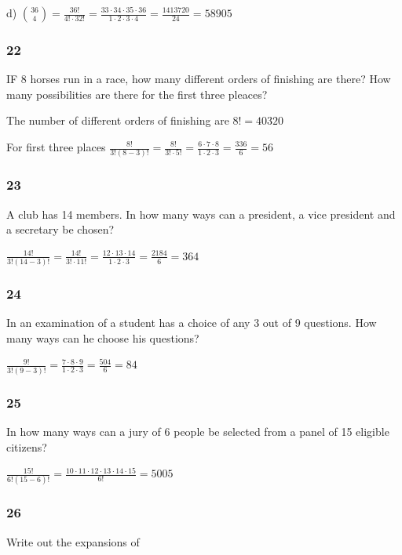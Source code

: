 \documentclass[]{report}
\begin{document}
d) ${36 \choose 4} = \frac{36!}{4!\cdot 32!} = \frac{33 \cdot 34 \cdot 35 \cdot 36}{1 \cdot 2 \cdot 3 \cdot 4} = \frac{1413720}{24}= 58905$

\subsubsection{22}

IF 8 horses run in a race, how many different orders of finishing are there? How many possibilities are there for the first three pleaces?

The number of different orders of finishing are $8! = 40320$

For first three places $\frac{8!}{3!(8-3)!} = \frac{8!}{3! \cdot 5!} = \frac{6 \cdot 7 \cdot 8}{1 \cdot 2 \cdot 3} = \frac{336}{6} = 56$

\subsubsection{23}

A club has 14 members. In how many ways can a president, a vice president and a secretary be chosen?

$\frac{14!}{3!(14-3)!} = \frac{14!}{3! \cdot 11!} = \frac{12 \cdot 13 \cdot 14}{1 \cdot 2 \cdot 3} = \frac{2184}{6} = 364$

\subsubsection{24}

In an examination of a student has a choice of any 3 out of 9 questions. How many ways can he choose his questions?

$\frac{9!}{3!(9 - 3)!} = \frac{7 \cdot 8 \cdot 9}{1 \cdot 2 \cdot 3} = \frac{504}{6} = 84$

\subsubsection{25}

In how many ways can a jury of 6 people be selected from a panel of 15 eligible citizens?

$\frac{15!}{6!(15 - 6)!} = \frac{10 \cdot 11 \cdot 12 \cdot 13 \cdot 14 \cdot 15}{6!} = 5005$

\subsubsection{26}
Write out the expansions of 
\end{document}
